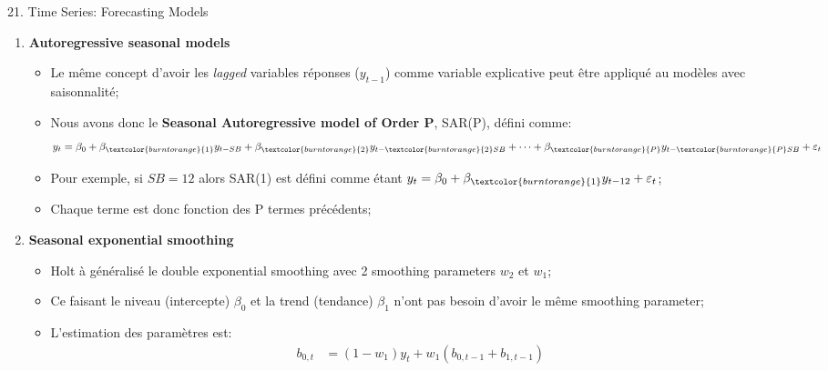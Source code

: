\documentclass[12pt, titlepage, french]{report}
\begin{document}
\begin{CHPT_SUMM}[label = {timeseries21}]{21. Time Series: Forecasting Models}
\begin{enumerate}
\begin{itemize}
\begin{align*}
		\end{align*}
		Pour exemple, si le série était des observations mensuelles alors $SB = 12$;
		\item	Par la suite, on défini le modèle de régression linéaire multiple avec $k = 2m$ et $m \le SB/2$ variables explicatives: 
		\begin{align*}
			y_{t}
				&=	\beta_{0} + S_t + \varepsilon_{t}	\\
				&=	\beta_{0} + \sum_{i = 1}^{m} \{ \beta_{1i} \sin(f_{i}t) + \beta_{2i} \cos(f_{i}t)	 \} + \varepsilon_{t} 
		\end{align*}
		\end{itemize}
	\item[]	\textbf{Autoregressive seasonal models}
		\begin{itemize}
		\item	Le même concept d'avoir les \textit{lagged} variables réponses ($y_{t - 1}$) comme variable explicative peut être appliqué au modèles avec saisonnalité;
		\item	Nous avons donc le \textbf{Seasonal Autoregressive model of \textcolor{burntorange}{Order P}}, SAR(\textcolor{burntorange}{P}), défini comme:
		\begin{align*}
			y_{t}
				&=	\beta_{0} + \beta_{\textcolor{burntorange}{1}}y_{t - SB} + \beta_{\textcolor{burntorange}{2}} y_{t - \textcolor{burntorange}{2}SB} + \dots + \beta_{\textcolor{burntorange}{P}} y_{t - \textcolor{burntorange}{P} SB} + \varepsilon_{t}
		\end{align*}
		\item[]	Pour exemple, si $SB = 12$ alors SAR(\textcolor{burntorange}{1}) est défini comme étant $y_{t} = \beta_{0} + \beta_{\textcolor{burntorange}{1}}y_{t - 12} + \varepsilon_{t}$;
		\item	Chaque terme est donc fonction des P termes précédents;
		\end{itemize}
	\item[]	\textbf{Seasonal exponential smoothing}
		\begin{itemize}
		\item	Holt à généralisé le double exponential smoothing avec 2 smoothing parameters $w_{2}$ et $w_{1}$;
		\item[]	Ce faisant le niveau (intercepte) $\beta_{0}$ et la trend (tendance) $\beta_{1}$ n'ont pas besoin d'avoir le même smoothing parameter;
		\item	L'estimation des paramètres est:
			\begin{align*}
			b_{0, t}	
			&=	(1 - w_{1}) y_{t} + w_{1} (b_{0, t - 1} + b_{1, t - 1})	\\

\end{align*}
\end{itemize}
\end{enumerate}
\end{CHPT_SUMM}
\end{document}
